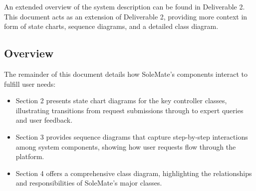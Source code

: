 \documentclass[]{article}
\begin{document}
An extended overview of the system description can be found in Deliverable 2. This document acts as an extension
of Deliverable 2, providing more context in form of state charts, sequence diagrams, and a detailed class
diagram.

\subsection{Overview}
\label{sub:overview}
The remainder of this document details how SoleMate’s components interact to fulfill user needs:

\begin{itemize}
	\item Section 2 presents state chart diagrams for the key controller classes, illustrating transitions from request submissions through to expert queries and user feedback.
	\item Section 3 provides sequence diagrams that capture step-by-step interactions among system components, showing how user requests flow through the platform.
	\item Section 4 offers a comprehensive class diagram, highlighting the relationships and responsibilities of SoleMate’s major classes.
\end{itemize}


\end{document}
